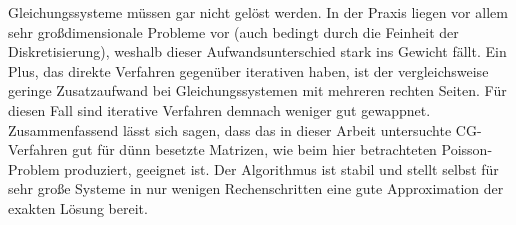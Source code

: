 \documentclass{scrartcl}
\begin{document}
Gleichungssysteme müssen gar nicht gelöst werden.
In der Praxis liegen vor allem sehr großdimensionale Probleme vor (auch bedingt durch die Feinheit der Diskretisierung), weshalb dieser Aufwandsunterschied stark ins Gewicht fällt.
Ein Plus, das direkte Verfahren gegenüber iterativen haben, ist der vergleichsweise geringe Zusatzaufwand bei Gleichungssystemen mit mehreren rechten Seiten.
Für diesen Fall sind iterative Verfahren demnach weniger gut gewappnet. \\
Zusammenfassend lässt sich sagen, dass das in dieser Arbeit untersuchte CG-Verfahren gut für dünn besetzte Matrizen, wie beim hier betrachteten Poisson-Problem produziert, geeignet ist.
Der Algorithmus ist stabil und stellt selbst für sehr große Systeme in nur wenigen Rechenschritten eine gute Approximation der exakten Lösung bereit. 


\pagebreak


\end{document}
